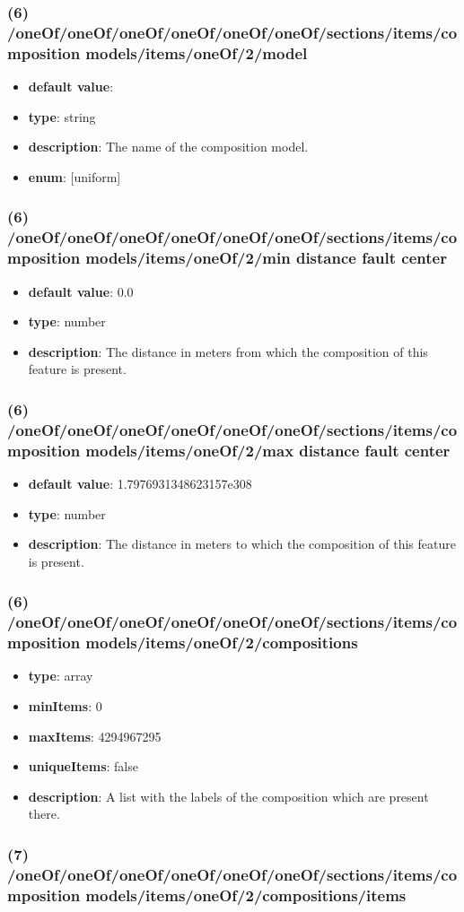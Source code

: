 \subsubsection{(6) /oneOf/oneOf/oneOf/oneOf/oneOf/oneOf/sections/items/composition models/items/oneOf/2/model}
\begin{itemize}[leftmargin=6em]\item {\bf default value}: 
\item {\bf type}: string
\item {\bf description}: The name of the composition model.
\item {\bf enum}: [uniform]\end{itemize}\subsubsection{(6) /oneOf/oneOf/oneOf/oneOf/oneOf/oneOf/sections/items/composition models/items/oneOf/2/min distance fault center}
\begin{itemize}[leftmargin=6em]\item {\bf default value}: 0.0
\item {\bf type}: number
\item {\bf description}: The distance in meters from which the composition of this feature is present.
\end{itemize}\subsubsection{(6) /oneOf/oneOf/oneOf/oneOf/oneOf/oneOf/sections/items/composition models/items/oneOf/2/max distance fault center}
\begin{itemize}[leftmargin=6em]\item {\bf default value}: 1.7976931348623157e308
\item {\bf type}: number
\item {\bf description}: The distance in meters to which the composition of this feature is present.
\end{itemize}\subsubsection{(6) /oneOf/oneOf/oneOf/oneOf/oneOf/oneOf/sections/items/composition models/items/oneOf/2/compositions}
\begin{itemize}[leftmargin=6em]\item {\bf type}: array
\item {\bf minItems}: 0
\item {\bf maxItems}: 4294967295
\item {\bf uniqueItems}: false
\item {\bf description}: A list with the labels of the composition which are present there.
\end{itemize}\subsubsection{(7) /oneOf/oneOf/oneOf/oneOf/oneOf/oneOf/sections/items/composition models/items/oneOf/2/compositions/items}
